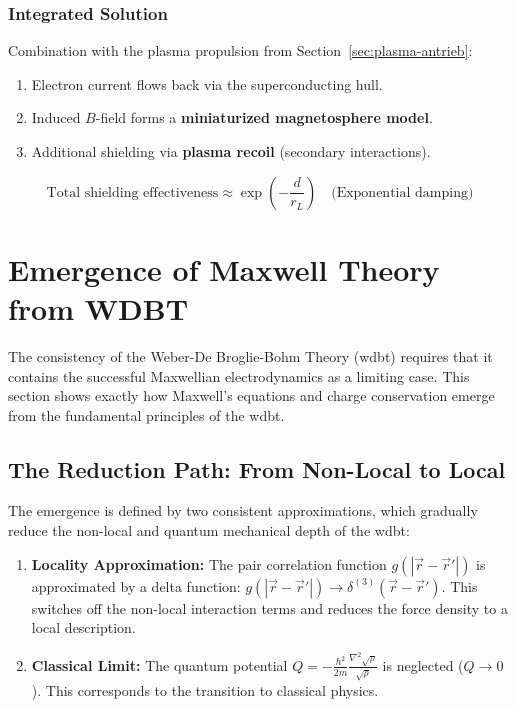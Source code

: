 \subsection{Integrated Solution}
Combination with the plasma propulsion from Section~\ref{sec:plasma-antrieb}:
\begin{enumerate}
    \item Electron current flows back via the superconducting hull.
    \item Induced $B$-field forms a \textbf{miniaturized magnetosphere model}.
    \item Additional shielding via \textbf{plasma recoil} (secondary interactions).
\end{enumerate}

\begin{equation}
    \text{Total shielding effectiveness} \approx \exp\left(-\frac{d}{r_L}\right) \quad \text{(Exponential damping)}
\end{equation}

\chapter{Emergence of Maxwell Theory from WDBT}
\label{sec:emergence-maxwell}

The consistency of the Weber-De Broglie-Bohm Theory (\gls{wdbt}) requires that it contains the successful Maxwellian electrodynamics as a limiting case. This section shows exactly how Maxwell's equations and charge conservation emerge from the fundamental principles of the \gls{wdbt}.

\section{The Reduction Path: From Non-Local to Local}

The emergence is defined by two consistent approximations, which gradually reduce the non-local and quantum mechanical depth of the \gls{wdbt}:

\begin{enumerate}
    \item \textbf{Locality Approximation:} The pair correlation function $g(|\vec{r} - \vec{r}'|)$ is approximated by a delta function: $g(|\vec{r} - \vec{r}'|) \rightarrow \delta^{(3)}(\vec{r} - \vec{r}')$. This switches off the non-local interaction terms and reduces the force density to a local description.
    \item \textbf{Classical Limit:} The quantum potential $Q = -\frac{\hbar^2}{2m} \frac{\nabla^2 \sqrt{\rho}}{\sqrt{\rho}}$ is neglected ($Q \rightarrow 0$). This corresponds to the transition to classical physics.
\end{enumerate}

